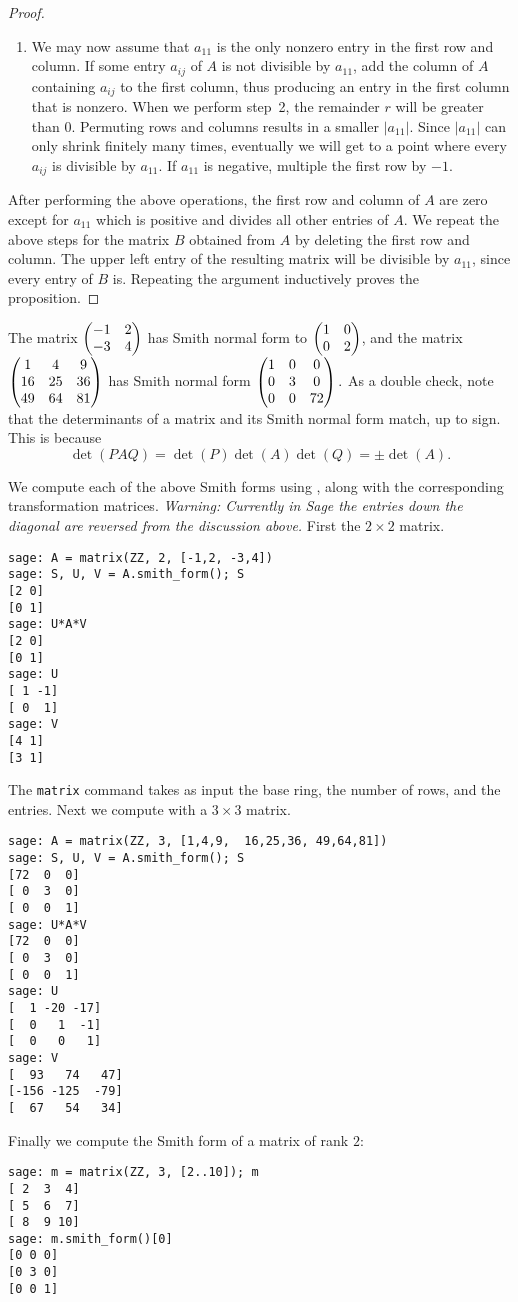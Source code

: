 \begin{proof}
\begin{enumerate}
\item We may now assume that $a_{11}$ is the only nonzero entry in the
first row and column.  If some entry $a_{ij}$ of $A$ is not divisible
by $a_{11}$, add the column of $A$ containing $a_{ij}$ to the first
column, thus producing an entry in the first column that is nonzero.
When we perform step~2, the remainder $r$ will be greater than $0$.
Permuting rows and columns results in a smaller $|a_{11}|$.  Since
$|a_{11}|$ can only shrink finitely many times, eventually we will get
to a point where every $a_{ij}$ is divisible by $a_{11}$.  If $a_{11}$
is negative, multiple the first row by $-1$.
\end{enumerate}
After performing the above operations, the first row and column
of $A$ are zero except for $a_{11}$ which is positive and divides
all other entries of $A$.  We repeat the above steps for the 
matrix $B$ obtained from $A$ by deleting the first row and column.
The upper left entry of the resulting matrix will be divisible by
$a_{11}$, since every entry of $B$ is.  Repeating the argument
inductively proves the proposition.
\end{proof}

\begin{example}
The matrix $\left( \begin{matrix}-1&2\\-3&4 \end{matrix}\right)$ has Smith normal form
to $\left( \begin{matrix}1&0\\0&2 \end{matrix}\right)$,
and the matrix 
$\left( \begin{matrix}1&4&9\\16&25&36\\49&64&81 \end{matrix}\right)$
has Smith normal form
$\left( \begin{matrix}1&0&0\\0&3&0\\0&0&72 \end{matrix}\right).$
As a double check, note that the determinants of a matrix and its Smith
normal form match, up to sign. This is because
$$\det(PAQ) = \det(P)\det(A)\det(Q) = \pm \det(A).$$

We compute each of the above Smith forms using \sage,
along with the corresponding transformation matrices.
{\em Warning: Currently in Sage the entries down the diagonal
are reversed from the discussion above.}
First the $2\times 2$ matrix.
\begin{verbatim}
sage: A = matrix(ZZ, 2, [-1,2, -3,4])
sage: S, U, V = A.smith_form(); S
[2 0]
[0 1]
sage: U*A*V
[2 0]
[0 1]
sage: U
[ 1 -1]
[ 0  1]
sage: V
[4 1]
[3 1]
\end{verbatim}
The \sage{} {\tt matrix} command takes as input the base ring, the number
of rows, and the entries.  Next we compute with a $3\times3$ matrix.
\begin{verbatim}
sage: A = matrix(ZZ, 3, [1,4,9,  16,25,36, 49,64,81])
sage: S, U, V = A.smith_form(); S
[72  0  0]
[ 0  3  0]
[ 0  0  1]
sage: U*A*V
[72  0  0]
[ 0  3  0]
[ 0  0  1]
sage: U
[  1 -20 -17]
[  0   1  -1]
[  0   0   1]
sage: V
[  93   74   47]
[-156 -125  -79]
[  67   54   34]
\end{verbatim}

Finally we compute the Smith form of a matrix of rank $2$:
\begin{verbatim}
sage: m = matrix(ZZ, 3, [2..10]); m
[ 2  3  4]
[ 5  6  7]
[ 8  9 10]
sage: m.smith_form()[0]
[0 0 0]
[0 3 0]
[0 0 1]
\end{verbatim}
\end{example}


